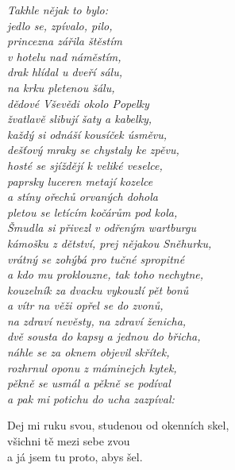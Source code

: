 
\re{}


\textit{Takhle nějak to bylo:\\
jedlo se, zpívalo, pilo,\\
princezna zářila štěstím\\
v hotelu nad náměstím,\\
drak hlídal u dveří sálu,\\
na krku pletenou šálu,\\
dědové Vševědi okolo Popelky\\
žvatlavě slibují šaty a kabelky,\\
každý si odnáší kousíček úsměvu,\\
dešťový mraky se chystaly ke zpěvu,\\
hosté se sjíždějí k veliké veselce,\\
paprsky luceren metají kozelce\\
a stíny ořechů orvaných dohola\\
pletou se letícím kočárům pod kola,\\
Šmudla si přivezl v odřeným wartburgu\\
kámošku z dětství, prej nějakou Sněhurku,\\
vrátný se zohýbá pro tučné spropitné\\
a kdo mu proklouzne, tak toho nechytne,\\
kouzelník za dvacku vykouzlí pět bonů\\
a vítr na věži opřel se do zvonů,\\
na zdraví nevěsty, na zdraví ženicha,\\
dvě sousta do kapsy a jednou do břicha,\\
náhle se za oknem objevil skřítek,\\
rozhrnul oponu z máminejch kytek,\\
pěkně se usmál a pěkně se podíval\\
a pak mi potichu do ucha zazpíval:}


\cho{}
Dej mi ruku svou, studenou od okenních skel,\\
všichni tě mezi sebe zvou\\
a já jsem tu proto, abys šel. \quad \ 

